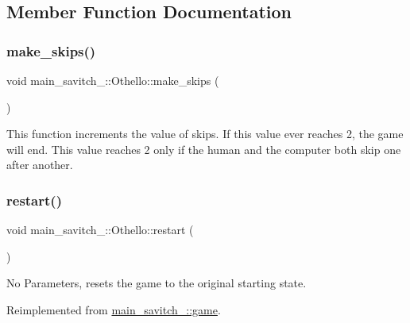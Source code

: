 \subsection{Member Function Documentation}
\mbox{\label{classmain__savitch__14_1_1_othello_a3177234195a490eef52343d957e64b5d}} 
\subsubsection{\texorpdfstring{make\+\_\+skips()}{make\_skips()}}
{\footnotesize\ttfamily void main\+\_\+savitch\+\_\+::\+Othello\+::make\+\_\+skips (\begin{DoxyParamCaption}{ }\end{DoxyParamCaption})}

This function increments the value of skips. If this value ever reaches 2, the game will end. This value reaches 2 only if the human and the computer both skip one after another. \mbox{\label{classmain__savitch__14_1_1_othello_abf872b8074bfa4c04119317dc3b39af2}} 
\subsubsection{\texorpdfstring{restart()}{restart()}}
{\footnotesize\ttfamily void main\+\_\+savitch\+\_\+::\+Othello\+::restart (\begin{DoxyParamCaption}{ }\end{DoxyParamCaption})\hspace{0.3cm}{\ttfamily [virtual]}}

No Parameters, resets the game to the original starting state. 

Reimplemented from \mbox{\hyperlink{classmain__savitch__14_1_1game}{main\+\_\+savitch\+\_\+::game}}.

\mbox{\label{classmain__savitch__14_1_1_othello_a4ea78b18eea66c944c0a9356349e0fd4}} 
